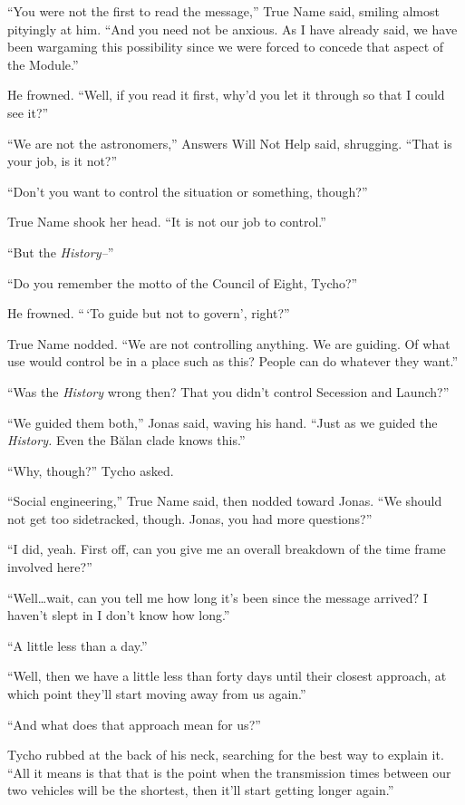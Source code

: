 ``You were not the first to read the message,'' True Name said, smiling almost pityingly at him. ``And you need not be anxious. As I have already said, we have been wargaming this possibility since we were forced to concede that aspect of the Module.''

He frowned. ``Well, if you read it first, why'd you let it through so that I could see it?''

``We are not the astronomers,'' Answers Will Not Help said, shrugging. ``That is your job, is it not?''

``Don't you want to control the situation or something, though?''

True Name shook her head. ``It is not our job to control.''

``But the \emph{History--}''

``Do you remember the motto of the Council of Eight, Tycho?''

He frowned. ``\,`To guide but not to govern', right?''

True Name nodded. ``We are not controlling anything. We are guiding. Of what use would control be in a place such as this? People can do whatever they want.''

``Was the \emph{History} wrong then? That you didn't control Secession and Launch?''

``We guided them both,'' Jonas said, waving his hand. ``Just as we guided the \emph{History.} Even the Bălan clade knows this.''

``Why, though?'' Tycho asked.

``Social engineering,'' True Name said, then nodded toward Jonas. ``We should not get too sidetracked, though. Jonas, you had more questions?''

``I did, yeah. First off, can you give me an overall breakdown of the time frame involved here?''

``Well\ldots wait, can you tell me how long it's been since the message arrived? I haven't slept in I don't know how long.''

``A little less than a day.''

``Well, then we have a little less than forty days until their closest approach, at which point they'll start moving away from us again.''

``And what does that approach mean for us?''

Tycho rubbed at the back of his neck, searching for the best way to explain it. ``All it means is that that is the point when the transmission times between our two vehicles will be the shortest, then it'll start getting longer again.''

